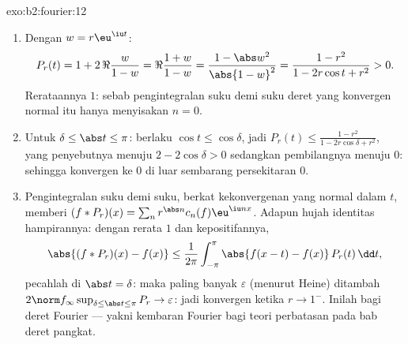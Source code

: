\begin{solution}{exo:b2:fourier:12}
\begin{enumerate}
  \item Dengan $w = r\eu^{\iu t}$:
        \[
        P_r(t) = 1 + 2\,\Re\frac{w}{1 - w}
        = \Re\frac{1 + w}{1 - w}
        = \frac{1 - \abs w^2}{\abs{1 - w}^2}
        = \frac{1 - r^2}{1 - 2r\cos t + r^2} > 0 .
        \]
        Rerataannya $1$: sebab pengintegralan suku demi suku deret yang
        konvergen normal itu hanya menyisakan $n = 0$.
  \item Untuk $\delta \leq \abs t \leq \pi$: berlaku $\cos t \leq
        \cos\delta$, jadi $P_r(t) \leq \frac{1 - r^2}{1 -
        2r\cos\delta + r^2}$, yang penyebutnya menuju $2 -
        2\cos\delta > 0$ sedangkan pembilangnya menuju $0$:
        sehingga konvergen  ke $0$ di luar sembarang persekitaran
        $0$.
  \item Pengintegralan suku demi suku, berkat kekonvergenan yang normal dalam $t$,
        memberi $(f * P_r)(x) = \sum_n r^{\abs
        n}c_n(f)\eu^{\iu nx}$. Adapun hujah identitas
        hampirannya: dengan rerata $1$ dan kepositifannya,
        \[
        \abs{(f*P_r)(x) - f(x)}
        \leq \frac{1}{2\pi}\int_{-\pi}^{\pi}
        \abs{f(x-t) - f(x)}\,P_r(t)\,\dd t ,
        \]
        pecahlah di $\abs t = \delta$: maka paling banyak $\varepsilon$
        (menurut Heine) ditambah $2\norm f_\infty\sup_{\delta\leq\abs
        t\leq\pi}P_r \to \varepsilon$: jadi konvergen  ketika
        $r \to 1^-$. Inilah  bagi deret
        Fourier --- yakni kembaran Fourier bagi teori perbatasan
        pada bab deret pangkat.
\end{enumerate}
\end{solution}

